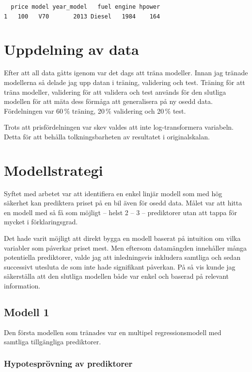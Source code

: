 \documentclass[
  letterpaper,
  DIV=11,
  numbers=noendperiod]{scrreprt}
\begin{document}
\begin{verbatim}
  price model year_model   fuel engine hpower
1   100   V70       2013 Diesel   1984    164
\end{verbatim}

\section{Uppdelning av data}\label{uppdelning-av-data}

Efter att all data gåtts igenom var det dags att träna modeller. Innan
jag tränade modellerna så delade jag upp datan i träning, validering och
test. Träning för att träna modeller, validering för att validera och
test används för den slutliga modellen för att mäta dess förmåga att
generalisera på ny osedd data. Fördelningen var 60\,\% träning, 20\,\%
validering och 20\,\% test.

Trots att prisfördelningen var skev valdes att inte log-transformera
variabeln. Detta för att behålla tolkningsbarheten av resultatet i
originalskalan.

\section{Modellstrategi}\label{modellstrategi}

Syftet med arbetet var att identifiera en enkel linjär modell som med
hög säkerhet kan prediktera priset på en bil även för osedd data. Målet
var att hitta en modell med så få som möjligt -- helst 2 -- 3 --
prediktorer utan att tappa för mycket i förklaringsgrad.

Det hade varit möjligt att direkt bygga en modell baserat på intuition
om vilka variabler som påverkar priset mest. Men eftersom datamängden
innehåller många potentiella prediktorer, valde jag att inledningsvis
inkludera samtliga och sedan successivt utesluta de som inte hade
signifikant påverkan. På så vis kunde jag säkerställa att den slutliga
modellen både var enkel och baserad på relevant information.

\subsection{Modell 1}\label{modell-1}

Den första modellen som tränades var en multipel regressionsmodell med
samtliga tillgängliga prediktorer.

\subsubsection{Hypotesprövning av
prediktorer}\label{hypotespruxf6vning-av-prediktorer}
\end{document}
